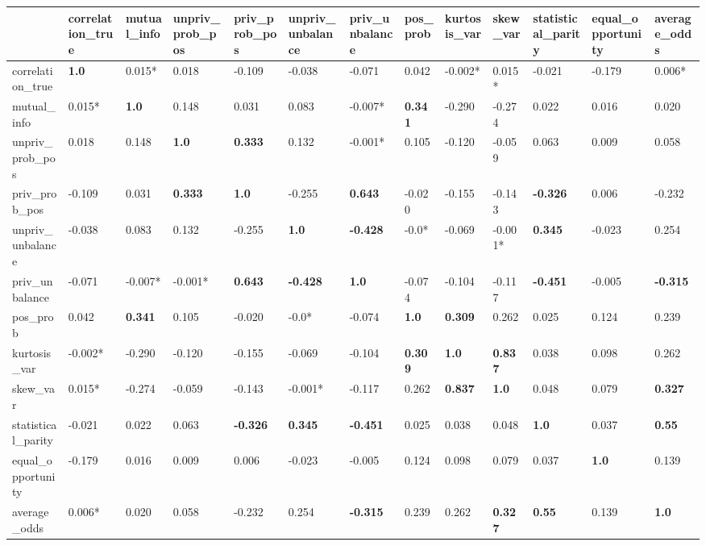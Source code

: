 \begin{tabular}{lllllllllllll}
\toprule
 & correlation_true & mutual_info & unpriv_prob_pos & priv_prob_pos & unpriv_unbalance & priv_unbalance & pos_prob & kurtosis_var & skew_var & statistical_parity & equal_opportunity & average_odds \\
\midrule
correlation_true & \cellcolor{black!25}\textbf{1.0} & 0.015* & 0.018 & -0.109 & -0.038 & -0.071 & 0.042 & -0.002* & 0.015* & -0.021 & -0.179 & 0.006* \\
mutual_info & 0.015* & \cellcolor{black!25}\textbf{1.0} & 0.148 & 0.031 & 0.083 & -0.007* & \cellcolor{black!25}\textbf{0.341} & -0.290 & -0.274 & 0.022 & 0.016 & 0.020 \\
unpriv_prob_pos & 0.018 & 0.148 & \cellcolor{black!25}\textbf{1.0} & \cellcolor{black!25}\textbf{0.333} & 0.132 & -0.001* & 0.105 & -0.120 & -0.059 & 0.063 & 0.009 & 0.058 \\
priv_prob_pos & -0.109 & 0.031 & \cellcolor{black!25}\textbf{0.333} & \cellcolor{black!25}\textbf{1.0} & -0.255 & \cellcolor{black!25}\textbf{0.643} & -0.020 & -0.155 & -0.143 & \cellcolor{black!25}\textbf{-0.326} & 0.006 & -0.232 \\
unpriv_unbalance & -0.038 & 0.083 & 0.132 & -0.255 & \cellcolor{black!25}\textbf{1.0} & \cellcolor{black!25}\textbf{-0.428} & -0.0* & -0.069 & -0.001* & \cellcolor{black!25}\textbf{0.345} & -0.023 & 0.254 \\
priv_unbalance & -0.071 & -0.007* & -0.001* & \cellcolor{black!25}\textbf{0.643} & \cellcolor{black!25}\textbf{-0.428} & \cellcolor{black!25}\textbf{1.0} & -0.074 & -0.104 & -0.117 & \cellcolor{black!25}\textbf{-0.451} & -0.005 & \cellcolor{black!25}\textbf{-0.315} \\
pos_prob & 0.042 & \cellcolor{black!25}\textbf{0.341} & 0.105 & -0.020 & -0.0* & -0.074 & \cellcolor{black!25}\textbf{1.0} & \cellcolor{black!25}\textbf{0.309} & 0.262 & 0.025 & 0.124 & 0.239 \\
kurtosis_var & -0.002* & -0.290 & -0.120 & -0.155 & -0.069 & -0.104 & \cellcolor{black!25}\textbf{0.309} & \cellcolor{black!25}\textbf{1.0} & \cellcolor{black!25}\textbf{0.837} & 0.038 & 0.098 & 0.262 \\
skew_var & 0.015* & -0.274 & -0.059 & -0.143 & -0.001* & -0.117 & 0.262 & \cellcolor{black!25}\textbf{0.837} & \cellcolor{black!25}\textbf{1.0} & 0.048 & 0.079 & \cellcolor{black!25}\textbf{0.327} \\
statistical_parity & -0.021 & 0.022 & 0.063 & \cellcolor{black!25}\textbf{-0.326} & \cellcolor{black!25}\textbf{0.345} & \cellcolor{black!25}\textbf{-0.451} & 0.025 & 0.038 & 0.048 & \cellcolor{black!25}\textbf{1.0} & 0.037 & \cellcolor{black!25}\textbf{0.55} \\
equal_opportunity & -0.179 & 0.016 & 0.009 & 0.006 & -0.023 & -0.005 & 0.124 & 0.098 & 0.079 & 0.037 & \cellcolor{black!25}\textbf{1.0} & 0.139 \\
average_odds & 0.006* & 0.020 & 0.058 & -0.232 & 0.254 & \cellcolor{black!25}\textbf{-0.315} & 0.239 & 0.262 & \cellcolor{black!25}\textbf{0.327} & \cellcolor{black!25}\textbf{0.55} & 0.139 & \cellcolor{black!25}\textbf{1.0} \\
\bottomrule
\end{tabular}
